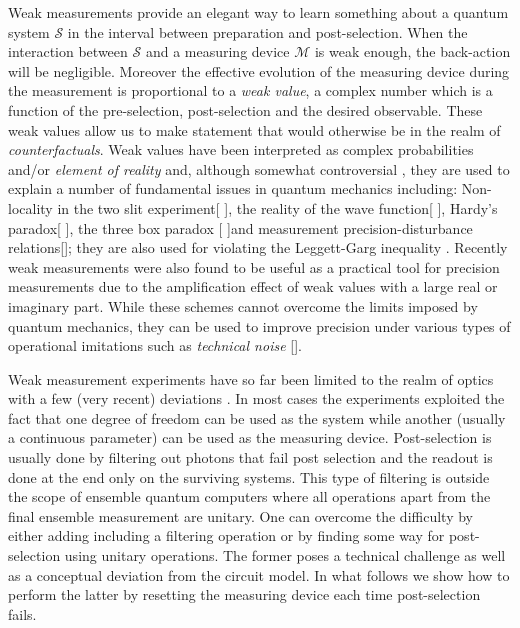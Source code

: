 \documentclass[aps,pra,12pt,onecolumn,showpacs,superscriptaddress,floatfix,footinbib,subfigure]{revtex4}
\def\es{{\mathcal{S}}}
\def\md{{\mathcal{M}}}
\begin{document}
Weak measurements provide an elegant way to learn something about a quantum system $\es$  in the interval between preparation and post-selection. When the interaction between $\es$ and a measuring device $\md$ is weak enough, the back-action will be negligible. Moreover the effective evolution of the measuring device during the measurement is proportional to a \emph{weak value}, a complex number which is a function of the pre-selection, post-selection and the desired observable. These weak values allow us to make statement that would otherwise be in the realm of \emph{counterfactuals}. Weak values have been interpreted  as complex probabilities \cite{Hofmann2013} and/or  \emph{element of reality} \cite{Vaidman1996} and, although somewhat controversial \cite{Peres1989, Aharonov1989, Leggett1989}, they are  used to explain a number of fundamental issues in quantum mechanics including: Non-locality in the two slit experiment[ ], the reality of the wave function[ ], Hardy's paradox[ ], the three box paradox [ ]and  measurement precision-disturbance relations[]; they are also used for violating the Leggett-Garg inequality \cite{Goggin2011,Williams2008}. Recently weak measurements were also found to be useful as a practical tool for precision measurements due to the  amplification effect of weak values with a large real or imaginary part.  While these schemes cannot overcome the limits imposed by quantum mechanics, they can be used to improve precision under  various types of operational imitations  such as \emph{technical noise} [].

Weak measurement experiments have so far been limited to the realm of optics with a few (very recent)  deviations \cite{Shomroni2013, Groen2013} . In most cases the experiments exploited the fact that one degree of freedom can be used as the system while another (usually a continuous parameter) can be used as the measuring device.  Post-selection is usually done by filtering out photons that fail post selection and the readout is done at the end only on the surviving systems. This type of filtering is outside the scope of ensemble quantum computers where all operations apart from the final ensemble measurement are unitary. One can overcome the difficulty by either adding including a filtering operation or by finding some way for post-selection using unitary operations. The former poses a technical challenge  as well as a conceptual deviation from the circuit model. In what follows we show how to perform the latter by resetting the measuring device each time post-selection fails.
\end{document}
